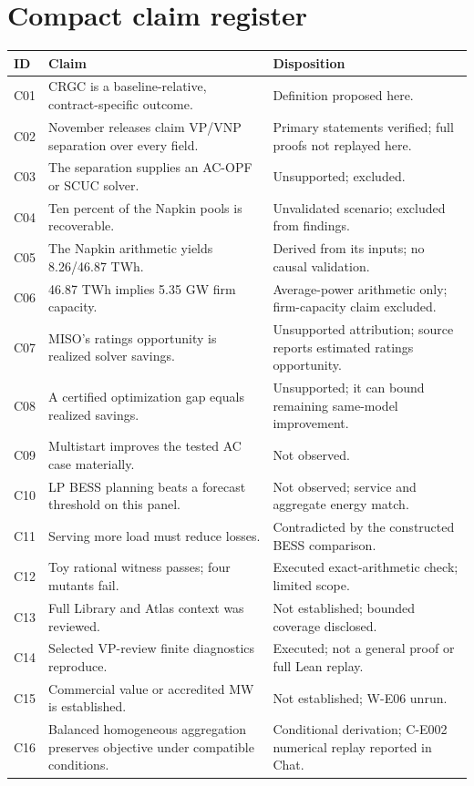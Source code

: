 \documentclass[11pt,letterpaper]{article}
\begin{document}
\section{Compact claim register}
\begingroup\small
\begin{longtable}{P{.10\linewidth}P{.46\linewidth}P{.35\linewidth}}
\toprule ID & Claim & Disposition\\\midrule\endhead
C01 & CRGC is a baseline-relative, contract-specific outcome. & Definition proposed here.\\
C02 & November releases claim VP/VNP separation over every field. & Primary statements verified; full proofs not replayed here.\\
C03 & The separation supplies an AC-OPF or SCUC solver. & Unsupported; excluded.\\
C04 & Ten percent of the Napkin pools is recoverable. & Unvalidated scenario; excluded from findings.\\
C05 & The Napkin arithmetic yields 8.26/46.87 TWh. & Derived from its inputs; no causal validation.\\
C06 & 46.87 TWh implies 5.35 GW firm capacity. & Average-power arithmetic only; firm-capacity claim excluded.\\
C07 & MISO's ratings opportunity is realized solver savings. & Unsupported attribution; source reports estimated ratings opportunity.\\
C08 & A certified optimization gap equals realized savings. & Unsupported; it can bound remaining same-model improvement.\\
C09 & Multistart improves the tested AC case materially. & Not observed.\\
C10 & LP BESS planning beats a forecast threshold on this panel. & Not observed; service and aggregate energy match.\\
C11 & Serving more load must reduce losses. & Contradicted by the constructed BESS comparison.\\
C12 & Toy rational witness passes; four mutants fail. & Executed exact-arithmetic check; limited scope.\\
C13 & Full Library and Atlas context was reviewed. & Not established; bounded coverage disclosed.\\
C14 & Selected VP-review finite diagnostics reproduce. & Executed; not a general proof or full Lean replay.\\
C15 & Commercial value or accredited MW is established. & Not established; W-E06 unrun.\\
C16 & Balanced homogeneous aggregation preserves objective under compatible conditions. & Conditional derivation; C-E002 numerical replay reported in Chat.\\

\end{longtable}
\end{document}
